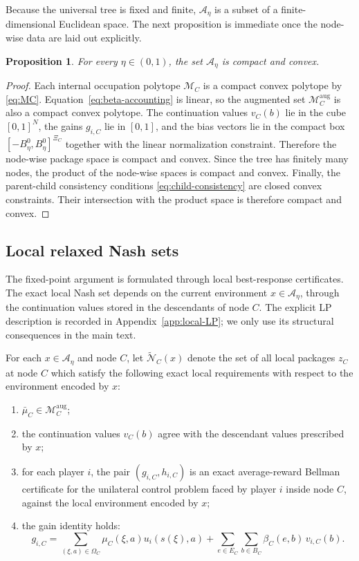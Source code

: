 \documentclass[12pt]{article}
\newtheorem{proposition}[theorem]{Proposition}
\theoremstyle{definition}
\newcommand{\1}{\mathbf{1}}
\newcommand{\cA}{\mathcal{A}}
\newcommand{\cM}{\mathcal{M}}
\newcommand{\cN}{\mathcal{N}}
\begin{document}
Because the universal tree is fixed and finite, \(\cA_\eta\) is a subset of a
finite-dimensional Euclidean space.  The next proposition is immediate once the node-wise
data are laid out explicitly.

\begin{proposition}
\label{prop:Aeta-compact}
For every \(\eta\in(0,1)\), the set \(\cA_\eta\) is compact and convex.
\end{proposition}

\begin{proof}
Each internal occupation polytope \(\cM_C\) is a compact convex polytope by
\eqref{eq:MC}.  Equation~\eqref{eq:beta-accounting} is linear, so the augmented set
\(\cM_C^{\mathrm{aug}}\) is also a compact convex polytope.  The continuation values
\(v_C(b)\) lie in the cube \([0,1]^N\), the gains \(g_{i,C}\) lie in \([0,1]\), and the
bias vectors lie in the compact box \([-B_\eta^0,B_\eta^0]^{\Xi_C}\) together with the
linear normalization constraint.  Therefore the node-wise package space is compact and
convex.  Since the tree has finitely many nodes, the product of the node-wise spaces is
compact and convex.  Finally, the parent-child consistency conditions
\eqref{eq:child-consistency} are closed convex constraints.  Their intersection with the
product space is therefore compact and convex.
\end{proof}

\subsection{Local relaxed Nash sets}

The fixed-point argument is formulated through local best-response certificates.
The exact local Nash set depends on the current environment \(x\in\cA_\eta\), through the
continuation values stored in the descendants of node \(C\).  The explicit LP description
is recorded in Appendix~\ref{app:local-LP}; we only use its structural consequences in the
main text.

For each \(x\in\cA_\eta\) and node \(C\), let \(\widetilde{\cN}_C(x)\) denote the set of
all local packages \(z_C\) at node \(C\) which satisfy the following exact local
requirements with respect to the environment encoded by \(x\):
\begin{enumerate}[label=\textnormal{(N\arabic*)},leftmargin=2.6em]
\item \(\bar\mu_C\in \cM_C^{\mathrm{aug}}\);
\item the continuation values \(v_C(b)\) agree with the descendant values prescribed by
\(x\);
\item for each player \(i\), the pair \((g_{i,C},h_{i,C})\) is an exact average-reward
Bellman certificate for the unilateral control problem faced by player \(i\) inside node
\(C\), against the local environment encoded by \(x\);
\item the gain identity holds:
\[
g_{i,C}
=
\sum_{(\xi,a)\in \Omega_C}\mu_C(\xi,a)u_i(s(\xi),a)
+
\sum_{e\in E_C}\sum_{b\in B_C}\beta_C(e,b)\,v_{i,C}(b).
\]
\end{enumerate}
\end{document}
